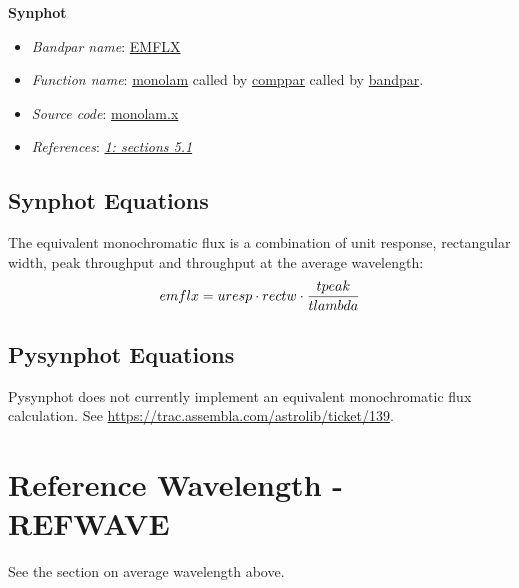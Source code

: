 \documentclass[letterpaper,10pt,english]{sphinxtsr}
\begin{document}
\textbf{Synphot}
\begin{itemize}
\item {} 
\emph{Bandpar name}: \href{https://svn.stsci.edu/trac/ssb/stsci\_python/browser/stsdas/trunk/stsdas/pkg/hst\_calib/synphot/doc/bandpar.hlp}{EMFLX}

\item {} 
\emph{Function name}: \href{https://svn.stsci.edu/trac/ssb/stsci\_python/browser/stsdas/trunk/stsdas/pkg/hst\_calib/synphot/newlib/monolam.x}{monolam}
called by \href{https://svn.stsci.edu/trac/ssb/stsci\_python/browser/stsdas/trunk/stsdas/pkg/hst\_calib/synphot/bandpar/comppar.x}{comppar} called by \href{https://svn.stsci.edu/trac/ssb/stsci\_python/browser/stsdas/trunk/stsdas/pkg/hst\_calib/synphot/bandpar/bandpar.x}{bandpar}.

\item {} 
\emph{Source code}: \href{https://svn.stsci.edu/trac/ssb/stsci\_python/browser/stsdas/trunk/stsdas/pkg/hst\_calib/synphot/newlib/monolam.x}{monolam.x}

\item {} 
\emph{References}: {\hyperref[references:ref1]{\emph{1: sections 5.1}}}

\end{itemize}


\section{Synphot Equations}
\label{main:id46}
The equivalent monochromatic flux is a combination of unit response,
rectangular width, peak throughput and throughput at the average wavelength:
\begin{gather}
\begin{split}emflx = uresp \cdot rectw \cdot \frac{tpeak}{tlambda}\end{split}\notag
\end{gather}

\section{Pysynphot Equations}
\label{main:id47}
Pysynphot does not currently implement an equivalent monochromatic flux
calculation. See \href{https://trac.assembla.com/astrolib/ticket/139}{https://trac.assembla.com/astrolib/ticket/139}.


\chapter{Reference Wavelength - REFWAVE}
\label{main:reference-wavelength-refwave}
See the section on average wavelength above.
\end{document}
